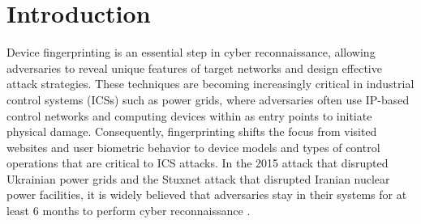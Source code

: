 \section{Introduction}
\label{sec:intro}

Device fingerprinting is an essential step in cyber reconnaissance, allowing adversaries to reveal unique features of target networks and design effective attack strategies. These techniques are becoming increasingly critical in industrial control systems (ICSs) such as power grids, where adversaries often use IP-based control networks and computing devices within as entry points to initiate physical damage. Consequently, fingerprinting shifts the focus from visited websites and user biometric behavior to device models and types of control operations that are critical to ICS attacks. In the 2015 attack that disrupted Ukrainian power grids and the Stuxnet attack that disrupted Iranian nuclear power facilities, it is widely believed that adversaries stay in their systems for at least 6 months to perform cyber reconnaissance \cite{ukraine2015, stuxnet2011}. 


